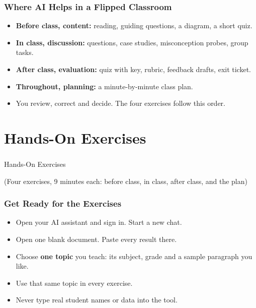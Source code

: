 \begin{frame}[fragile]\frametitle{Where AI Helps in a Flipped Classroom}
\begin{itemize}
\item \textbf{Before class, content:} reading, guiding questions, a diagram, a short quiz.
\item \textbf{In class, discussion:} questions, case studies, misconception probes, group tasks.
\item \textbf{After class, evaluation:} quiz with key, rubric, feedback drafts, exit ticket.
\item \textbf{Throughout, planning:} a minute-by-minute class plan.
\item You review, correct and decide. The four exercises follow this order.
\end{itemize}
\end{frame}

\section[Exercises]{Hands-On Exercises}

\begin{frame}[fragile]\frametitle{}
\begin{center}
{\Large Hands-On Exercises}

\medskip
{\small (Four exercises, 9 minutes each: before class, in class, after class, and the plan)}
\end{center}
\end{frame}

\begin{frame}[fragile]\frametitle{Get Ready for the Exercises}
\begin{itemize}
\item Open your AI assistant and sign in. Start a new chat.
\item Open one blank document. Paste every result there.
\item Choose \textbf{one topic} you teach: its subject, grade and a sample paragraph you like.
\item Use that same topic in every exercise.
\item Never type real student names or data into the tool.
\end{itemize}
\end{frame}

